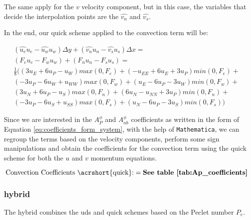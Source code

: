 The same apply for the $v$ velocity component, but in this case, the variables that decide the interpolation points are the $\hat{v_n}$ and $\hat{v_s}$.

In the end, our \acrshort{quick} scheme applied to the convection term will be:

\begin{gather}
    \left(\hat{u_e}u_e - \hat{u_w}u_w\right) \Delta y + \left(\hat{v_n}u_n - \hat{v_s}u_s\right) \Delta x = \\
    \left(F_e u_e - F_w u_w\right) + \left(F_n u_n - F_s u_s\right) = \\
    \frac{1}{8} (
    (3 u_{E} + 6 u_{P} - u_{W}) max(0, F_e) + (- u_{EE} + 6 u_{E} + 3 u_{P}) min(0, F_e) + \\
    (- 3 u_{P} - 6 u_{W} + u_{WW}) max(0, F_w) + (u_{E} - 6 u_{P} - 3 u_{W}) min(0, F_w) + \\
    (3 u_{N} + 6 u_{P} - u_{S}) max(0, F_n) + (6 u_{N} - u_{NN} + 3 u_{P}) min(0, F_n) + \\
    (- 3 u_{P} - 6 u_{S} + u_{SS}) max(0, F_s) + (u_{N} - 6 u_{P} - 3 u_{S}) min(0, F_s)
    )
\end{gather}

Since we are interested in the $A_P^\phi$ and $A_{nb}^\phi$ coefficients as written in the form of Equation \ref{eq:coefficients_form_system}, with the help of \texttt{Mathematica}, we can regroup the terms based on the velocity components, perform some sign manipulations and obtain the coefficients for the convection term using the \acrshort{quick} scheme for both the $u$ and $v$ momentum equations.

\begin{equation*}
    \text{Convection Coefficients \acrshort{quick}:} = { \textbf{See table \ref{tab:Ap_coefficients}} }
\end{equation*}



%
%
\subsubsection{\acrfull{hybrid}}

The \acrfull{hybrid} combines the \acrshort{uds} and \acrshort{quick} schemes based on the Peclet number $P_e$.

